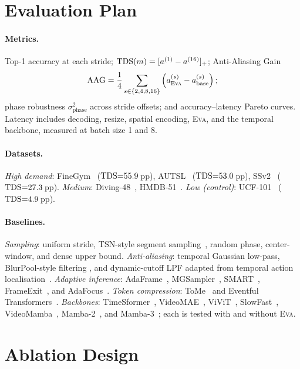 \documentclass[10pt,twocolumn]{article}
\newcommand{\EVA}{\textsc{Eva}}
\newcommand{\TDS}{\ifmmode\mathrm{TDS}\else\textsc{TDS}\fi}
\newcommand{\AAG}{\ifmmode\mathrm{AAG}\else\textsc{AAG}\fi}
\begin{document}
\section{Evaluation Plan}
\label{sec:eval}

\paragraph{Metrics.}
Top-1 accuracy at each stride; $\TDS(m) = [a^{(1)} - a^{(16)}]_+$;
Anti-Aliasing Gain
\[
    \AAG = \frac{1}{4}\sum_{s\in\{2,4,8,16\}}
    \left(a_{\EVA}^{(s)} - a_{\mathrm{base}}^{(s)}\right);
\]
phase robustness $\sigma^2_{\mathrm{phase}}$ across stride offsets; and
accuracy--latency Pareto curves. Latency includes decoding, resize, spatial
encoding, \EVA{}, and the temporal backbone, measured at batch size 1 and 8.

\paragraph{Datasets.}
\textit{High demand}: FineGym~\cite{finegym} ($\TDS{=}55.9$\,pp),
AUTSL~\cite{autsl} ($\TDS{=}53.0$\,pp),
SSv2~\cite{ssv2} ($\TDS{=}27.3$\,pp).
\textit{Medium}: Diving-48~\cite{diving48}, HMDB-51~\cite{hmdb51}.
\textit{Low (control)}: UCF-101~\cite{ucf101} ($\TDS{=}4.9$\,pp).

\paragraph{Baselines.}
\textit{Sampling}: uniform stride, TSN-style segment sampling~\cite{tsn},
random phase, center-window, and dense upper bound.
\textit{Anti-aliasing}: temporal Gaussian low-pass, BlurPool-style filtering
\cite{blurpool}, and dynamic-cutoff LPF adapted from temporal action
localisation~\cite{lpf_tal}.
\textit{Adaptive inference}: AdaFrame~\cite{adaframe}, MGSampler~\cite{mgsampler},
SMART~\cite{smart}, FrameExit~\cite{frameexit}, and AdaFocus~\cite{adafocus}.
\textit{Token compression}: ToMe~\cite{tome} and Eventful
Transformers~\cite{eventful}.
\textit{Backbones}: TimeSformer~\cite{timesformer}, VideoMAE~\cite{videomae},
ViViT~\cite{vivit}, SlowFast~\cite{slowfast}, VideoMamba~\cite{videomamba},
Mamba-2~\cite{mamba2}, and Mamba-3~\cite{mamba3}; each is tested with and
without \EVA{}.

\section{Ablation Design}
\label{sec:ablation}
\end{document}
